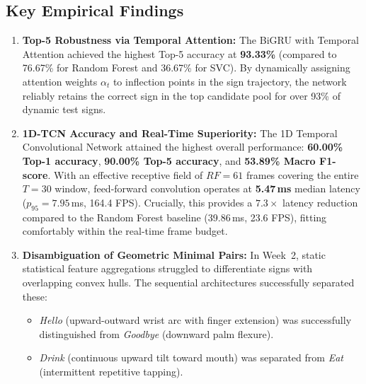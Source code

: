 \documentclass{article}
\begin{document}
\subsection*{Key Empirical Findings}
\begin{enumerate}
    \item \textbf{Top-5 Robustness via Temporal Attention:} 
    The BiGRU with Temporal Attention achieved the highest Top-5 accuracy at \textbf{93.33\%} (compared to 76.67\% for Random Forest and 36.67\% for SVC). By dynamically assigning attention weights $\alpha_t$ to inflection points in the sign trajectory, the network reliably retains the correct sign in the top candidate pool for over 93\% of dynamic test signs.

    \item \textbf{1D-TCN Accuracy and Real-Time Superiority:} 
    The 1D Temporal Convolutional Network attained the highest overall performance: \textbf{60.00\% Top-1 accuracy}, \textbf{90.00\% Top-5 accuracy}, and \textbf{53.89\% Macro F1-score}. With an effective receptive field of $RF = 61$ frames covering the entire $T = 30$ window, feed-forward convolution operates at \textbf{5.47\,ms} median latency ($p_{95} = 7.95$\,ms, 164.4 FPS). Crucially, this provides a $7.3\times$ latency reduction compared to the Random Forest baseline (39.86\,ms, 23.6 FPS), fitting comfortably within the real-time frame budget.

    \item \textbf{Disambiguation of Geometric Minimal Pairs:}
    In Week~2, static statistical feature aggregations struggled to differentiate signs with overlapping convex hulls. The sequential architectures successfully separated these:
    \begin{itemize}
        \item \textit{Hello} (upward-outward wrist arc with finger extension) was successfully distinguished from \textit{Goodbye} (downward palm flexure).
        \item \textit{Drink} (continuous upward tilt toward mouth) was separated from \textit{Eat} (intermittent repetitive tapping).
    \end{itemize}
\end{enumerate}
\end{document}
